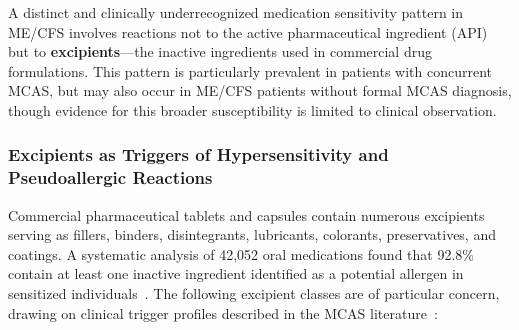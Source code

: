 A distinct and clinically underrecognized medication sensitivity pattern in ME/CFS involves reactions not to the active pharmaceutical ingredient (API) but to \textbf{excipients}---the inactive ingredients used in commercial drug formulations. This pattern is particularly prevalent in patients with concurrent MCAS, but may also occur in ME/CFS patients without formal MCAS diagnosis, though evidence for this broader susceptibility is limited to clinical observation.

\subsubsection{Excipients as Triggers of Hypersensitivity and Pseudoallergic Reactions}

Commercial pharmaceutical tablets and capsules contain numerous excipients serving as fillers, binders, disintegrants, lubricants, colorants, preservatives, and coatings. A systematic analysis of 42,052 oral medications found that 92.8\% contain at least one inactive ingredient identified as a potential allergen in sensitized individuals~\cite{Reker2019excipients}. The following excipient classes are of particular concern, drawing on clinical trigger profiles described in the MCAS literature~\cite{Afrin2016}:


